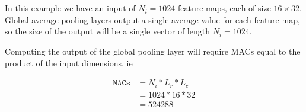 \documentclass[12pt]{article}
\begin{document}
\section{}

In this example we have an input of $N_i = 1024$ feature maps, each of size $16
\times 32$. Global average pooling layers output a single average value for
each feature map, so the size of the output will be a single vector of length
$N_i=1024$.
\newline

Computing the output of the global pooling layer will require MACs equal to the
product of the input dimensions, ie

\begin{align}
	\texttt{MACs} &= N_i * L_r * L_c \\
	&= 1024 * 16 * 32 \\
	&= 524288
\end{align}
\end{document}
